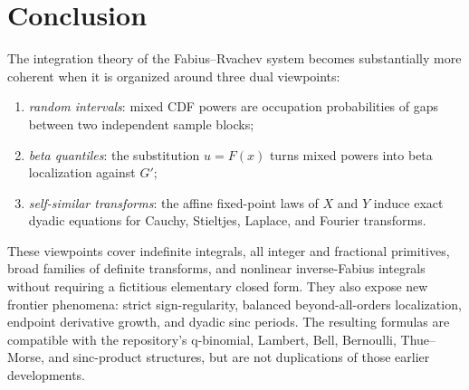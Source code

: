 \documentclass[11pt,oneside]{article}
\theoremstyle{definition}
\theoremstyle{remark}
\newcommand{\F}{F}
\newcommand{\G}{G}
\begin{document}
\section{Conclusion}

The integration theory of the Fabius--Rvachev system becomes substantially more
coherent when it is organized around three dual viewpoints:
\begin{enumerate}
 \item \emph{random intervals}: mixed CDF powers are occupation probabilities
       of gaps between two independent sample blocks;
 \item \emph{beta quantiles}: the substitution \(u=\F(x)\) turns mixed powers
       into beta localization against \(\G'\);
 \item \emph{self-similar transforms}: the affine fixed-point laws of \(X\) and
       \(Y\) induce exact dyadic equations for Cauchy, Stieltjes, Laplace, and
       Fourier transforms.
\end{enumerate}
These viewpoints cover indefinite integrals, all integer and fractional
primitives, broad families of definite transforms, and nonlinear inverse-Fabius
integrals without requiring a fictitious elementary closed form.  They also
expose new frontier phenomena: strict sign-regularity, balanced
beyond-all-orders localization, endpoint derivative growth, and dyadic sinc
periods.  The resulting formulas are compatible with the repository's
q-binomial, Lambert, Bell, Bernoulli, Thue--Morse, and sinc-product structures,
but are not duplications of those earlier developments.
\end{document}

